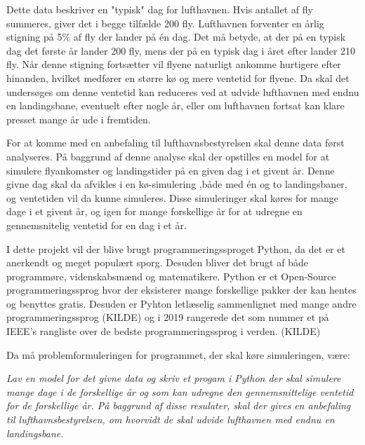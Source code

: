Dette data beskriver en "typisk" dag for lufthavnen. Hvis antallet af fly summeres, giver det i begge tilfælde 200 fly. Lufthavnen forventer en årlig stigning på 5\% af fly der lander på én dag. Det må betyde, at der på en typisk dag det første år lander 200 fly, mens der på en typisk dag i året efter lander 210 fly. Når denne stigning fortsætter vil flyene naturligt ankomme hurtigere efter hinanden, hvilket medfører en større kø og mere ventetid for flyene. Da skal det undersøges om denne ventetid kan reduceres ved at udvide lufthavnen med endnu en landingsbane, eventuelt efter nogle år, eller om lufthavnen fortsat kan klare presset mange år ude i fremtiden.

For at komme med en anbefaling til lufthavnsbestyrelsen skal denne data først analyseres. På baggrund af denne analyse skal der opstilles en model for at simulere flyankomster og landingstider på en given dag i et givent år.
Denne givne dag skal da afvikles i en kø-simulering ,både med én og to landingsbaner, og ventetiden vil da kunne simuleres.
Disse simuleringer skal køres for mange dage i et givent år, og igen for mange forskellige år for at udregne en gennemsnitelig ventetid for en dag i et år.

I dette projekt vil der blive brugt programmeringssproget Python, da det er et anerkendt og meget populært sporg. Desuden bliver det brugt af både programmøre, videnskabsmænd og matematikere. Python er et Open-Source programmeringssprog hvor der eksisterer mange forskellige pakker der kan hentes og benyttes gratis. Desuden er Pyhton letlæselig sammenlignet med mange andre programmeringssprog (KILDE) og i 2019 rangerede det som nummer et på \textsc{IEEE}'s rangliste over de bedste programmeringssprog i verden. (KILDE)

Da må problemformuleringen for programmet, der skal køre simuleringen, være:

\begin{center}
	\textit{Lav en model for det givne data og skriv et progam i Python der skal simulere mange dage i de forskellige år og som kan udregne den gennemsnittelige ventetid for de forskellige år.
	På baggrund af disse resulater, skal der gives en anbefaling til lufthavnsbestyrelsen, om hvorvidt de skal udvide lufthavnen med endnu en landingsbane.}
\end{center}
